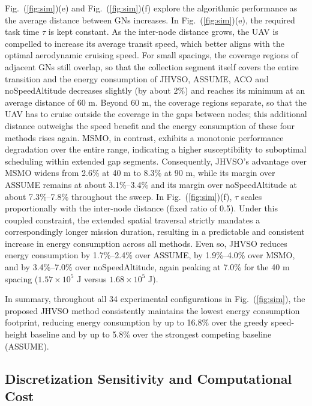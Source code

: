 Fig.~(\ref{fig:sim})(e) and Fig.~(\ref{fig:sim})(f) explore the algorithmic performance as the average distance between GNs increases.
In Fig.~(\ref{fig:sim})(e), the required task time $\tau$ is kept constant.
As the inter-node distance grows, the UAV is compelled to increase its average transit speed, which better aligns with the optimal aerodynamic cruising speed.
For small spacings, the coverage regions of adjacent GNs still overlap, so that the collection segment itself covers the entire transition and the energy consumption of JHVSO, ASSUME, ACO and noSpeedAltitude decreases slightly (by about 2\%) and reaches its minimum at an average distance of 60 m.
Beyond 60 m, the coverage regions separate, so that the UAV has to cruise outside the coverage in the gaps between nodes; this additional distance outweighs the speed benefit and the energy consumption of these four methods rises again.
MSMO, in contrast, exhibits a monotonic performance degradation over the entire range, indicating a higher susceptibility to suboptimal scheduling within extended gap segments.
Consequently, JHVSO's advantage over MSMO widens from 2.6\% at 40 m to 8.3\% at 90 m, while its margin over ASSUME remains at about 3.1\%--3.4\% and its margin over noSpeedAltitude at about 7.3\%--7.8\% throughout the sweep.
In Fig.~(\ref{fig:sim})(f), $\tau$ scales proportionally with the inter-node distance (fixed ratio of 0.5).
Under this coupled constraint, the extended spatial traversal strictly mandates a correspondingly longer mission duration, resulting in a predictable and consistent increase in energy consumption across all methods.
Even so, JHVSO reduces energy consumption by 1.7\%--2.4\% over ASSUME, by 1.9\%--4.0\% over MSMO, and by 3.4\%--7.0\% over noSpeedAltitude, again peaking at 7.0\% for the 40 m spacing ($1.57\times10^{5}$ J versus $1.68\times10^{5}$ J).

In summary, throughout all 34 experimental configurations in Fig.~(\ref{fig:sim}), the proposed JHVSO method consistently maintains the lowest energy consumption footprint, reducing energy consumption by up to 16.8\% over the greedy speed-height baseline and by up to 5.8\% over the strongest competing baseline (ASSUME).

\subsection{Discretization Sensitivity and Computational Cost}

